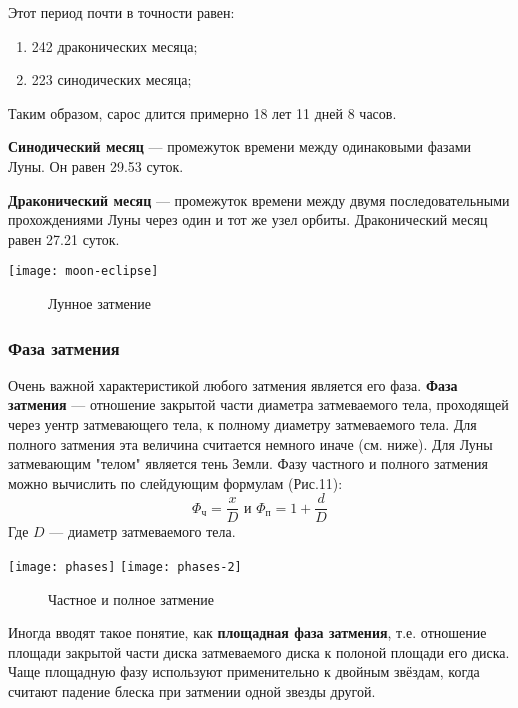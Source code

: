 Этот период почти в точности равен:
\begin{enumerate}
\item 242 драконических месяца;
\item 223 синодических месяца;
\end{enumerate}

Таким образом, сарос длится примерно 18 лет 11 дней 8 часов.

\textbf{Синодический месяц} --- промежуток времени между одинаковыми фазами Луны. Он равен 29.53 суток.

\textbf{Драконический месяц} --- промежуток времени между двумя последовательными прохождениями Луны через один и тот же узел орбиты. Драконический месяц равен 27.21 суток.
\begin{center}
\texttt{[image: moon-eclipse]}
\begin{figure}[h!]
\caption{Лунное затмение}
\end{figure}
\end{center}
\subsubsection{Фаза затмения}
Очень важной характеристикой любого затмения является его фаза. \textbf{Фаза затмения} --- отношение закрытой части диаметра затмеваемого тела, проходящей через уентр затмевающего тела, к полному диаметру затмеваемого тела. Для полного затмения эта величина считается немного иначе (см. ниже). Для Луны затмевающим "телом" является тень Земли. Фазу частного и полного затмения можно вычислить по слейдующим формулам (Рис.11):
$$\Phi_{\text{ч}}=\frac{x}{D} \text{ и } \Phi_{\text{п}}=1+\frac{d}{D}$$
Где $D$ --- диаметр затмеваемого тела.
\begin{center}
\texttt{[image: phases]}
\texttt{[image: phases-2]}
\begin{figure}[h!]
\caption{Частное и полное затмение}
\end{figure}
\end{center}

Иногда вводят такое понятие, как \textbf{площадная фаза затмения}, т.е. отношение площади закрытой части диска затмеваемого диска к полоной площади его диска. Чаще площадную фазу используют применительно к двойным звёздам, когда считают падение блеска при затмении одной звезды другой.